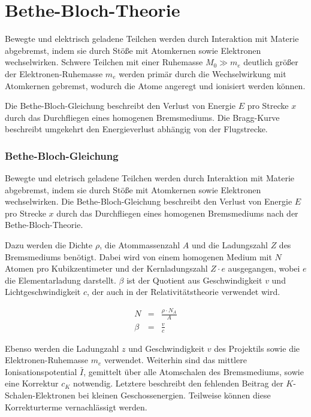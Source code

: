 \documentclass[12pt,a4paper]{scrartcl}
\numberwithin{equation}{section} %
\renewcommand{\[}{} %
\renewcommand{\]}{\noindent} %
\begin{document}
\hypertarget{bethe-bloch-theorie}{%
\section{Bethe-Bloch-Theorie}\label{bethe-bloch-theorie}}

Bewegte und elektrisch geladene Teilchen werden durch Interaktion mit
Materie abgebremst, indem sie durch Stöße mit Atomkernen sowie
Elektronen wechselwirken. Schwere Teilchen mit einer Ruhemasse
\(M_0\gg m_e\) deutlich größer der Elektronen-Ruhemasse \(m_e\) werden
primär durch die Wechselwirkung mit Atomkernen gebremst, wodurch die
Atome angeregt und ionisiert werden können.

Die Bethe-Bloch-Gleichung beschreibt den Verlust von Energie \(E\) pro
Strecke \(x\) durch das Durchfliegen eines homogenen Bremsmediums. Die
Bragg-Kurve beschreibt umgekehrt den Energieverlust abhängig von der
Flugstrecke.

\hypertarget{bethe-bloch-gleichung}{%
\subsubsection{Bethe-Bloch-Gleichung}\label{bethe-bloch-gleichung}}

Bewegte und eletrisch geladene Teilchen werden durch Interaktion mit
Materie abgebremst, indem sie durch Stöße mit Atomkernen sowie
Elektronen wechselwirken. Die Bethe-Bloch-Gleichung beschreibt den
Verlust von Energie \(E\) pro Strecke \(x\) durch das Durchfliegen eines
homogenen Bremsmediums nach der Bethe-Bloch-Theorie.

Dazu werden die Dichte \(\rho\), die Atommassenzahl \(A\) und die
Ladungszahl \(Z\) des Bremsmediums benötigt. Dabei wird von einem
homogenen Medium mit \(N\) Atomen pro Kubikzentimeter und der
Kernladungszahl \(Z\cdot e\) ausgegangen, wobei \(e\) die
Elementarladung darstellt. \(\beta\) ist der Quotient aus
Geschwindigkeit \(v\) und Lichtgeschwindigkeit \(c\), der auch in der
Relativitätstheorie verwendet wird.

\[
\begin{eqnarray}
        N &=& \frac{\rho\cdot N_A}{A} \\
        \beta &=& \frac{v}{c}
\end{eqnarray}
\]

Ebenso werden die Ladungzahl \(z\) und Geschwindigkeit \(v\) des
Projektils sowie die Elektronen-Ruhemasse \(m_e\) verwendet. Weiterhin
sind das mittlere Ionisationspotential \(\bar I\), gemittelt über alle
Atomschalen des Bremsmediums, sowie eine Korrektur \(c_K\) notwendig.
Letztere beschreibt den fehlenden Beitrag der \(K\)-Schalen-Elektronen
bei kleinen Geschossenergien. Teilweise können diese Korrekturterme
vernachlässigt werden.
\end{document}
